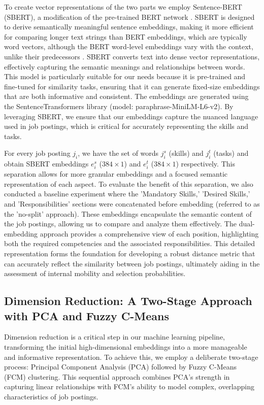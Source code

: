 To create vector representations of the two parts we employ Sentence-BERT (SBERT), a modification of 
the pre-trained BERT network \citep{devlin2018bert}. SBERT is designed to derive semantically meaningful 
sentence embeddings, making it more efficient for comparing longer text strings than BERT embeddings, which 
are typically word vectors, although the BERT word-level embeddings vary with the context, unlike their 
predecessors \citep{reimers-2019-sentence-bert}. SBERT converts text into dense vector representations, 
effectively capturing the semantic meanings and relationships between words. This model is particularly 
suitable for our needs because it is pre-trained and fine-tuned for similarity tasks, ensuring that it 
can generate fixed-size embeddings that are both informative and consistent. The embeddings are generated 
using the SentenceTransformers library (model: paraphrase-MiniLM-L6-v2). By leveraging SBERT, we ensure that 
our embeddings capture the nuanced language used in job postings, which is critical for accurately representing 
the skills and tasks.

For every job posting $j_i$, we have the set of words $j_i^s$ (skills) and $j_i^t$ (tasks) and obtain SBERT 
embeddings $e_i^s$ ($384 \times 1$) and $e_i^t$ ($384 \times 1$) respectively. This separation allows for 
more granular embeddings and a focused semantic representation of each aspect. To evaluate the benefit of 
this separation, we also conducted a baseline experiment where the 'Mandatory Skills,' 'Desired Skills,' 
and 'Responsibilities' sections were concatenated before embedding (referred to as the 'no-split' approach). 
These embeddings encapsulate the semantic content of the job postings, allowing us to compare and analyze 
them effectively. The dual-embedding approach provides a comprehensive view of each position, highlighting 
both the required competencies and the associated responsibilities. This detailed representation forms the 
foundation for developing a robust distance metric that can accurately reflect the similarity between 
job postings, ultimately aiding in the assessment of internal mobility and selection probabilities.


\subsection{Dimension Reduction: A Two-Stage Approach with PCA and Fuzzy C-Means}

Dimension reduction is a critical step in our machine learning pipeline, transforming the initial high-dimensional 
embeddings into a more manageable and informative representation. To achieve this, we employ a deliberate two-stage 
process: Principal Component Analysis (PCA) followed by Fuzzy C-Means (FCM) clustering. This sequential approach 
combines PCA's strength in capturing linear relationships with FCM's ability to model complex, overlapping 
characteristics of job postings.

